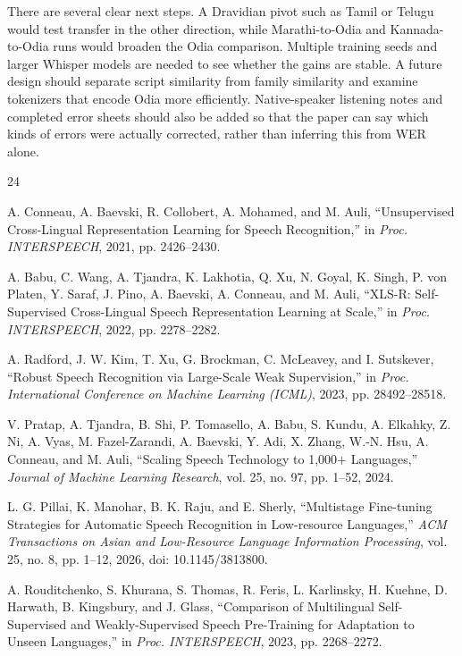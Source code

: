 \documentclass[conference]{IEEEtran}
\begin{document}
There are several clear next steps. A Dravidian pivot such as Tamil or
Telugu would test transfer in the other direction, while Marathi-to-Odia
and Kannada-to-Odia runs would broaden the Odia comparison. Multiple
training seeds and larger Whisper models are needed to see whether the
gains are stable. A future design should separate script similarity
from family similarity and examine tokenizers that encode Odia more
efficiently. Native-speaker listening notes and completed error sheets
should also be added so that the paper can say which kinds of errors
were actually corrected, rather than inferring this from WER alone.

\begin{thebibliography}{24}

A. Conneau, A. Baevski, R. Collobert, A. Mohamed, and M. Auli,
``Unsupervised Cross-Lingual Representation Learning for Speech
Recognition,'' in \emph{Proc. INTERSPEECH}, 2021, pp. 2426--2430.

A. Babu, C. Wang, A. Tjandra, K. Lakhotia, Q. Xu, N. Goyal,
K. Singh, P. von Platen, Y. Saraf, J. Pino, A. Baevski, A. Conneau, and
M. Auli, ``XLS-R: Self-Supervised Cross-Lingual Speech Representation
Learning at Scale,'' in \emph{Proc. INTERSPEECH}, 2022, pp. 2278--2282.

A. Radford, J. W. Kim, T. Xu, G. Brockman, C. McLeavey, and
I. Sutskever, ``Robust Speech Recognition via Large-Scale Weak
Supervision,'' in \emph{Proc. International Conference on Machine
Learning (ICML)}, 2023, pp. 28492--28518.

V. Pratap, A. Tjandra, B. Shi, P. Tomasello, A. Babu, S. Kundu,
A. Elkahky, Z. Ni, A. Vyas, M. Fazel-Zarandi, A. Baevski, Y. Adi,
X. Zhang, W.-N. Hsu, A. Conneau, and M. Auli, ``Scaling Speech
Technology to 1{,}000+ Languages,'' \emph{Journal of Machine Learning
Research}, vol. 25, no. 97, pp. 1--52, 2024.

L. G. Pillai, K. Manohar, B. K. Raju, and E. Sherly, ``Multistage
Fine-tuning Strategies for Automatic Speech Recognition in Low-resource
Languages,'' \emph{ACM Transactions on Asian and Low-Resource Language
Information Processing}, vol. 25, no. 8, pp. 1--12, 2026,
doi: 10.1145/3813800.

A. Rouditchenko, S. Khurana, S. Thomas, R. Feris, L. Karlinsky,
H. Kuehne, D. Harwath, B. Kingsbury, and J. Glass, ``Comparison of
Multilingual Self-Supervised and Weakly-Supervised Speech Pre-Training
for Adaptation to Unseen Languages,'' in \emph{Proc. INTERSPEECH}, 2023,
pp. 2268--2272.


\end{thebibliography}
\end{document}
